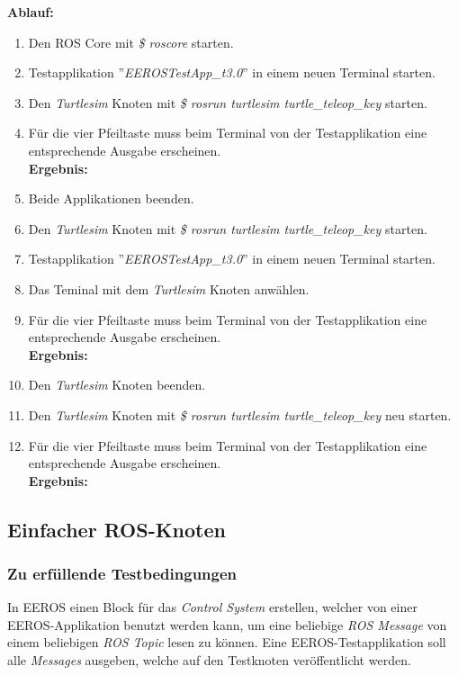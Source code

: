 \textbf{Ablauf: } 
\begin{enumerate}
\item Den ROS Core mit \textit{\$ roscore} starten.
\item Testapplikation ''\textit{EEROSTestApp\_t3.0}'' in einem neuen Terminal starten.
\item Den \textit{Turtlesim} Knoten mit \textit{\$ rosrun turtlesim turtle\_teleop\_key} starten.
\item Für die vier Pfeiltaste muss beim Terminal von der Testapplikation eine entsprechende Ausgabe erscheinen. \\
\textbf{Ergebnis:} \checkmark
\item Beide Applikationen beenden.
\item Den \textit{Turtlesim} Knoten mit \textit{\$ rosrun turtlesim turtle\_teleop\_key} starten.
\item Testapplikation ''\textit{EEROSTestApp\_t3.0}'' in einem neuen Terminal starten.
\item Das Teminal mit dem \textit{Turtlesim} Knoten anwählen.
\item Für die vier Pfeiltaste muss beim Terminal von der Testapplikation eine entsprechende Ausgabe erscheinen. \\
\textbf{Ergebnis:} \checkmark
\item Den \textit{Turtlesim} Knoten beenden.
\item Den \textit{Turtlesim} Knoten mit \textit{\$ rosrun turtlesim turtle\_teleop\_key} neu starten.
\item Für die vier Pfeiltaste muss beim Terminal von der Testapplikation eine entsprechende Ausgabe erscheinen. \\
\textbf{Ergebnis:} \checkmark
\end{enumerate}


\subsection{Einfacher ROS-Knoten}
\subsubsection{Zu erfüllende Testbedingungen}
In EEROS einen Block für das \textit{Control System} erstellen, welcher von einer EEROS-Applikation benutzt werden kann, um eine beliebige \textit{ROS Message} von einem beliebigen \textit{ROS Topic} lesen zu können.
Eine EEROS-Testapplikation soll alle \textit{Messages} ausgeben, welche auf den Testknoten veröffentlicht werden.

